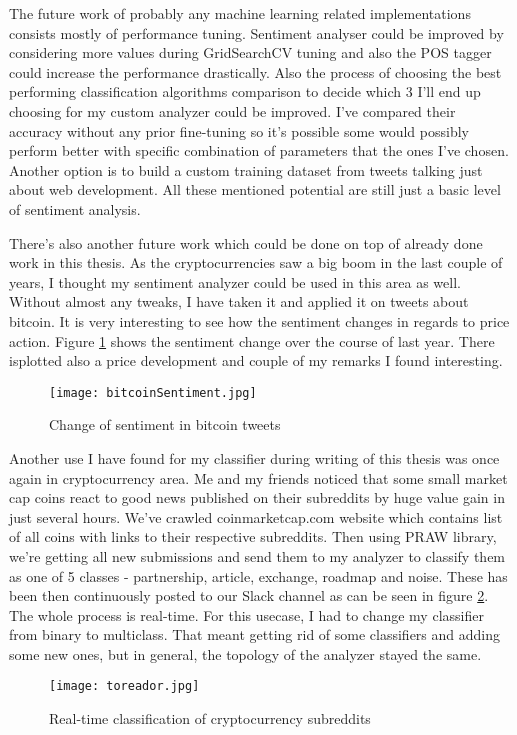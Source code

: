 The future work of probably any machine learning related implementations consists mostly of performance tuning. Sentiment analyser could be improved by considering more values during GridSearchCV tuning and also the POS tagger could increase the performance drastically. Also the process of choosing the best performing classification algorithms comparison to decide which 3 I'll end up choosing for my custom analyzer could be improved. I've compared their accuracy without any prior fine-tuning so it's possible some would possibly perform better with specific combination of parameters that the ones I've chosen. Another option is to build a custom training dataset from tweets talking just about web development. All these mentioned potential are still just a basic level of sentiment analysis.

There's also another future work which could be done on top of already done work in this thesis. As the cryptocurrencies saw a big boom in the last couple of years, I thought my sentiment analyzer could be used in this area as well. Without almost any tweaks, I have taken it and applied it on tweets about bitcoin. It is very interesting to see how the sentiment changes in regards to price action. Figure \ref{fig:bitcoinSentiment} shows the sentiment change over the course of last year. There isplotted also a price development and couple of my remarks I found interesting.

\begin{figure}[H]%
    \centering
	\texttt{[image: bitcoinSentiment.jpg]}
    \caption{Change of sentiment in bitcoin tweets}%
    \label{fig:bitcoinSentiment}%
\end{figure} 

Another use I have found for my classifier during writing of this thesis was once again in cryptocurrency area. Me and my friends noticed that some small market cap coins react to good news published on their subreddits by huge value gain in just several hours. We've crawled coinmarketcap.com website which contains list of all coins with links to their respective subreddits. Then using PRAW library, we're getting all new submissions and send them to my analyzer to classify them as one of 5 classes - partnership, article, exchange, roadmap and noise. These has been then continuously posted to our Slack channel as can be seen in figure \ref{fig:toreador}. The whole process is real-time. For this usecase, I had to change my classifier from binary to multiclass. That meant getting rid of some classifiers and adding some new ones, but in general, the topology of the analyzer stayed the same.

\begin{figure}[H]%
    \centering
	\texttt{[image: toreador.jpg]}
    \caption{Real-time classification of cryptocurrency subreddits}%
    \label{fig:toreador}%
\end{figure} 